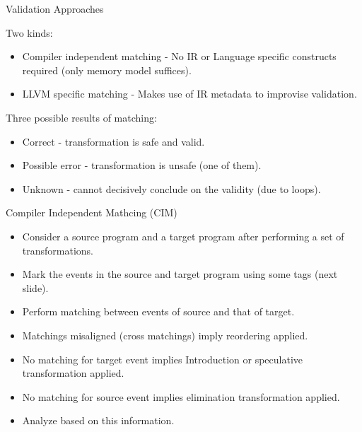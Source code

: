 \documentclass[xcolor=dvipsnames, notes]{beamer}
\begin{document}

    \begin{frame}{Validation Approaches}

        Two kinds:
        \begin{itemize}
            \item Compiler independent matching - No IR or Language specific constructs required (only memory model suffices).
            \item LLVM specific matching - Makes use of IR metadata to improvise validation.
        \end{itemize}
        
        Three possible results of matching:
        \begin{itemize}
            \item Correct - transformation is safe and valid. 
            \item Possible error - transformation is unsafe (one of them).
            \item Unknown - cannot decisively conclude on the validity (due to loops).
        \end{itemize}
        
    \end{frame}

    \begin{frame}{Compiler Independent Mathcing (CIM)}

        \begin{itemize}
            \item Consider a source program and a target program after performing a set of transformations.
            \item Mark the events in the source and target program using some tags (next slide).
            \item Perform matching between events of source and that of target.
            \item Matchings misaligned (cross matchings) imply reordering applied.
            \item No matching for target event implies Introduction or speculative transformation applied.
            \item No matching for source event implies elimination transformation applied.
            \item Analyze based on this information. 
        \end{itemize}

    \end{frame}
\end{document}
